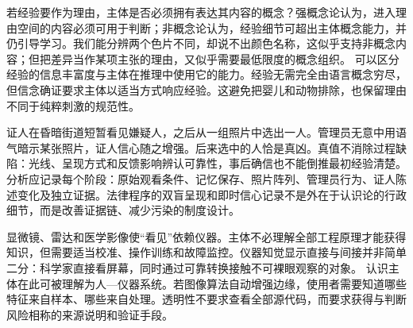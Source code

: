 若经验要作为理由，主体是否必须拥有表达其内容的概念？强概念论认为，进入理由空间的内容必须可用于判断；非概念论认为，经验细节可超出主体概念能力，并仍引导学习。我们能分辨两个色片不同，却说不出颜色名称，这似乎支持非概念内容；但把差异当作某项主张的理由，又似乎需要最低限度的概念组织。 可以区分经验的信息丰富度与主体在推理中使用它的能力。经验无需完全由语言概念穷尽，但信念确证要求主体以适当方式响应经验。这避免把婴儿和动物排除，也保留理由不同于纯粹刺激的规范性。

证人在昏暗街道短暂看见嫌疑人，之后从一组照片中选出一人。管理员无意中用语气暗示某张照片，证人信心随之增强。后来选中的人恰是真凶。真值不消除过程缺陷：光线、呈现方式和反馈影响辨认可靠性，事后确信也不能倒推最初经验清楚。 分析应记录每个阶段：原始观看条件、记忆保存、照片阵列、管理员行为、证人陈述变化及独立证据。法律程序的双盲呈现和即时信心记录不是外在于认识论的行政细节，而是改善证据链、减少污染的制度设计。

显微镜、雷达和医学影像使“看见”依赖仪器。主体不必理解全部工程原理才能获得知识，但需要适当校准、操作训练和故障监控。仪器知觉显示直接与间接并非简单二分：科学家直接看屏幕，同时通过可靠转换接触不可裸眼观察的对象。 认识主体在此可被理解为人—仪器系统。若图像算法自动增强边缘，使用者需要知道哪些特征来自样本、哪些来自处理。透明性不要求查看全部源代码，而要求获得与判断风险相称的来源说明和验证手段。
